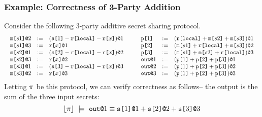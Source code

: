 \subsubsection{Example: Correctness of 3-Party Addition}
Consider the following 3-party additive secret sharing protocol.
{\footnotesize
$$
\begin{array}{c@{\qquad}c}
\begin{array}{lll}
  \elab{\mesg{s1}}{2} &:=& \elab{(\secret{1} \fminus \locflip \fminus \flip{x})}{1} \\ 
  \elab{\mesg{s1}}{3} &:=& \elab{\flip{x}}{1} \\ 
  \elab{\mesg{s2}}{1} &:=& \elab{(\secret{2} \fminus \locflip \fminus \flip{x})}{2} \\ 
  \elab{\mesg{s2}}{3} &:=& \elab{\flip{x}}{2} \\ 
  \elab{\mesg{s3}}{1} &:=& \elab{(\secret{3} \fminus \locflip \fminus \flip{x})}{3} \\ 
  \elab{\mesg{s3}}{2} &:=& \elab{\flip{x}}{3}
\end{array} & 
\begin{array}{lll}
  \rvl{1} &:=& \elab{(\locflip \fplus \mesg{s2} \fplus \mesg{s3})}{1} \\ 
  \rvl{2} &:=& \elab{(\mesg{s1} \fplus \locflip \fplus \mesg{s3})}{2} \\
  \rvl{3} &:=& \elab{(\mesg{s1} \fplus \mesg{s2} \fplus \locflip)}{3} \\
  \out{1} &:=& \elab{(\rvl{1} \fplus \rvl{2} + \rvl{3})}{1}\\
  \out{2} &:=& \elab{(\rvl{1} \fplus \rvl{2} + \rvl{3})}{2}\\
  \out{3} &:=& \elab{(\rvl{1} \fplus \rvl{2} + \rvl{3})}{3}
\end{array}
\end{array}
$$}
Letting $\pi$ be this protocol, we can verify correctness
as follows-- the output is the sum of the three input secrets:
$$
\lfloor \pi \rfloor\ \models\ \texttt{out}\texttt{@}1 \equiv \texttt{s[}1\texttt{]}\texttt{@}1 + \texttt{s[}2\texttt{]}\texttt{@}2 + \texttt{s[}3\texttt{]}\texttt{@}3
$$

